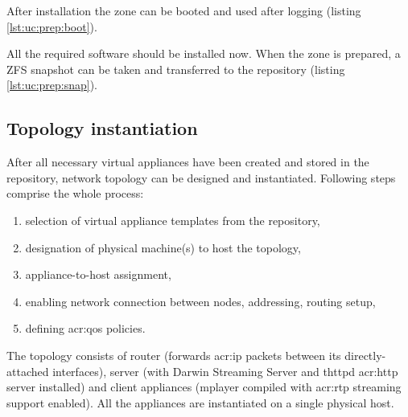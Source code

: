 \documentclass[11pt,openany]{book}
\begin{document}
        \noindent
        After installation the zone can be booted and used after logging (listing \ref{lst:uc:prep:boot}). \\

        \noindent
        \begin{minipage}{\textwidth}
          
        \end{minipage}

        \noindent
        All the required software should be installed now. When the zone is prepared, a ZFS snapshot can be taken and
        transferred to the repository (listing \ref{lst:uc:prep:snap}). \\

        \noindent
        \begin{minipage}{\textwidth}
          
        \end{minipage}


      \subsection{Topology instantiation}
      \label{ssub:}

        After all necessary virtual appliances have been created and stored in the repository, network topology can be
        designed and instantiated. Following steps comprise the whole process:

        \begin{enumerate}
          \item selection of virtual appliance templates from the repository,
          \item designation of physical machine(s) to host the topology,
          \item appliance-to-host assignment,
          \item enabling network connection between nodes, addressing, routing setup,
          \item defining \gls{acr:qos} policies.
        \end{enumerate}

        The topology consists of router (forwards \gls{acr:ip} packets between its directly-attached interfaces), server
        (with Darwin Streaming Server and thttpd \gls{acr:http} server installed) and client appliances (mplayer
        compiled with \gls{acr:rtp} streaming support enabled). All the appliances are instantiated on a single physical
        host.
\end{document}
